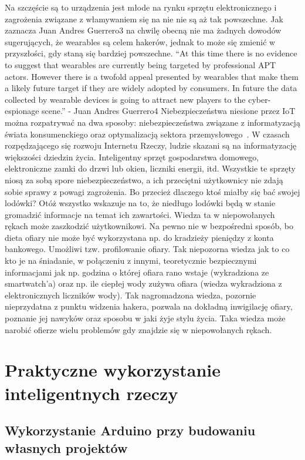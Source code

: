 \documentclass[brudnopis]{xmgr}
\begin{document}
Na szczęście są to urządzenia jest młode na rynku sprzętu elektronicznego i zagrożenia związane z włamywaniem się na nie nie są aż tak powszechne. Jak zaznacza Juan Andres Guerrero3 na chwilę obecną nie ma żadnych dowodów sugerujących, że wearables są celem hakerów, jednak to może się zmienić w przyszłości, gdy staną się bardziej powszechne.
“At this time there is no evidence to suggest that wearables are currently being targeted by professional APT actors. However there is a twofold appeal presented by wearables that make them a likely future target if they are widely adopted by consumers.  In future the data collected by wearable devices is going to attract new players to the cyber-espionage scene.” -  Juan Andres Guerrero4
Niebezpieczeństwa niesione przez IoT można rozpatrywać na dwa sposoby: niebezpieczeństwa związane z informatyzacją świata konsumenckiego oraz optymalizacją sektora przemysłowego~\cite{Ks:2014:CMC}. W czasach rozpędzającego się rozwoju Internetu Rzeczy, ludzie skazani są na informatyzację większości dziedzin życia. Inteligentny sprzęt gospodarstwa domowego, elektroniczne zamki do drzwi lub okien, liczniki energii, itd. Wszystkie te sprzęty niosą za sobą spore niebezpieczeństwo, a ich przeciętni użytkownicy nie zdają sobie sprawy z powagi zagrożenia. Bo przecież dlaczego ktoś miałby się bać swojej lodówki? Otóż wszystko wskazuje na to, że niedługo lodówki będą w stanie gromadzić informacje na temat ich zawartości. Wiedza ta w niepowołanych rękach może zaszkodzić użytkownikowi. Na pewno nie w bezpośredni sposób, bo dieta ofiary nie może być wykorzystana np. do kradzieży pieniędzy z konta bankowego. Umożliwi tzw. profilowanie ofiary. Tak niepozorna wiedza jak to co kto je na śniadanie, w połączeniu z innymi, teoretycznie bezpiecznymi informacjami jak np. godzina o której ofiara rano wstaje (wykradziona ze smartwatch'a) oraz np. ile ciepłej wody zużywa ofiara (wiedza wykradziona z elektronicznych liczników wody). Tak nagromadzona wiedza, pozornie nieprzydatna z punktu widzenia hakera, pozwala na dokładną inwigilację ofiary, poznanie jej nawyków oraz sposobu w jaki żyje stylu życia. Taka wiedza może narobić ofierze wielu problemów gdy znajdzie się w niepowołanych rękach.

\chapter{Praktyczne wykorzystanie inteligentnych rzeczy}


\section{Wykorzystanie Arduino przy budowaniu własnych projektów}
\end{document}
